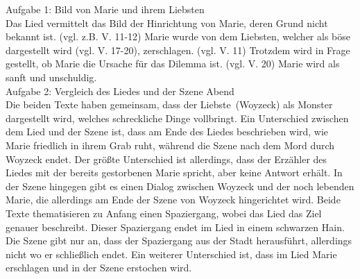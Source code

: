 \documentclass[a4paper, 12pt]{report}
\begin{document}
	\thispagestyle{empty}
	\noindent
	\Large Aufgabe 1: Bild von Marie und ihrem \dq Liebsten\dq
	\\[0.5cm]
	\large
	Das Lied vermittelt das Bild der Hinrichtung von Marie, deren Grund nicht bekannt ist. (vgl. z.B. V. 11-12) Marie wurde von dem \dq Liebsten\dq, welcher als böse dargestellt wird (vgl. V. 17-20), zerschlagen. (vgl. V. 11)
	Trotzdem wird in Frage gestellt, ob Marie die Ursache für das Dilemma ist. (vgl. V. 20) Marie wird als sanft und unschuldig.
	\\[1cm]
	\Large Aufgabe 2: Vergleich des Liedes und der Szene \dq Abend\dq
	\\[0.5cm]
	\large
	Die beiden Texte haben gemeinsam, dass der \dq Liebste\dq\ (Woyzeck) als Monster dargestellt wird, welches schreckliche Dinge vollbringt.
	Ein Unterschied zwischen dem Lied und der Szene ist, dass am Ende des Liedes beschrieben wird, wie Marie friedlich in ihrem Grab ruht, während die Szene nach dem Mord durch Woyzeck endet.
	Der größte Unterschied ist allerdings, dass der Erzähler des Liedes mit der bereits gestorbenen Marie spricht, aber keine Antwort erhält.
	In der Szene hingegen gibt es einen Dialog zwischen Woyzeck und der noch lebenden Marie, die allerdings am Ende der Szene von Woyzeck hingerichtet wird.
	Beide Texte thematisieren zu Anfang einen Spaziergang, wobei das Lied das Ziel genauer beschreibt.
	Dieser Spaziergang endet im Lied in einem schwarzen Hain.
	Die Szene gibt nur an, dass der Spaziergang aus der Stadt herausführt, allerdings nicht wo er schließlich endet.
	Ein weiterer Unterschied ist, dass im Lied Marie erschlagen und in der Szene erstochen wird.
\end{document}
